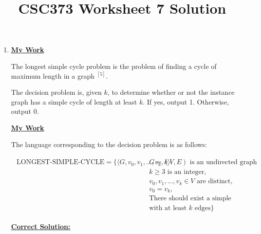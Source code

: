\documentclass[12pt]{article}
\begin{document}
\title{CSC373 Worksheet 7 Solution}
\maketitle

\bigskip

\begin{enumerate}[1.]
    \item

    \bigskip

    \begin{mdframed}
    \underline{\textbf{My Work}}

    \bigskip

    The longest simple cycle problem is the problem of finding a cycle of maximum
    length in a graph $^{[5]}$.
    \end{mdframed}

    \bigskip

    The decision problem is, given $k$, to determine whether or not the instance graph
    has a simple cycle of length at least $k$. If yes, output 1. Otherwise, output 0.

    \bigskip

    \begin{mdframed}
    \underline{\textbf{My Work}}

    \bigskip

    The language corresponding to the decision problem is as follows:

    \begin{align*}
        \begin{split}
            \text{LONGEST-SIMPLE-CYCLE} = \{\langle G,v_0,v_1,...,v_k,k\rangle: &\text{$G = (V,E)$ is an undirected graph}\\
            &\text{$k \geq 3$ is an integer,}\\
            &\text{$v_0,v_1,...,v_k \in V$ are distinct,}\\
            &\text{$v_0 = v_k$,}\\
            &\text{There should exist a simple cycle in G}\\
            &\text{with at least $k$ edges}\}
        \end{split}
    \end{align*}
    \end{mdframed}

    \bigskip

    \begin{mdframed}
    \underline{\textbf{Correct Solution:}}


\end{mdframed}
\end{enumerate}
\end{document}

